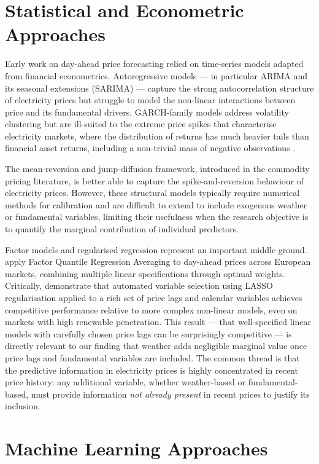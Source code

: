 \section{Statistical and Econometric Approaches}

Early work on day-ahead price forecasting relied on time-series models adapted
from financial econometrics. Autoregressive models — in particular ARIMA and
its seasonal extensions (SARIMA) — capture the strong autocorrelation structure
of electricity prices but struggle to model the non-linear interactions between
price and its fundamental drivers. GARCH-family models address volatility
clustering \citep{weron2014} but are ill-suited to the extreme price spikes
that characterise electricity markets, where the distribution of returns has
much heavier tails than financial asset returns, including a non-trivial mass
of negative observations \citep{fanone2013}.

The mean-reversion and jump-diffusion framework, introduced in the commodity
pricing literature, is better able to capture the spike-and-reversion behaviour
of electricity prices. However, these structural models typically require
numerical methods for calibration and are difficult to extend to include
exogenous weather or fundamental variables, limiting their usefulness when
the research objective is to quantify the marginal contribution of individual
predictors.

Factor models and regularised regression represent an important middle ground.
\citet{maciejowska2016} apply Factor Quantile Regression Averaging to
day-ahead prices across European markets, combining multiple linear
specifications through optimal weights. Critically, \citet{uniejewski2019}
demonstrate that automated variable selection using LASSO regularisation applied
to a rich set of price lags and calendar variables achieves competitive
performance relative to more complex non-linear models, even on markets with
high renewable penetration. This result — that well-specified linear models
with carefully chosen price lags can be surprisingly competitive — is directly
relevant to our finding that weather adds negligible marginal value once price
lags and fundamental variables are included. The common thread is that the
predictive information in electricity prices is highly concentrated in recent
price history: any additional variable, whether weather-based or
fundamental-based, must provide information \textit{not already present} in
recent prices to justify its inclusion.

\section{Machine Learning Approaches}

